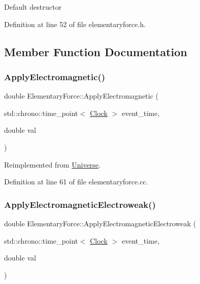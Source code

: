 Default destructor 

Definition at line 52 of file elementaryforce.\+h.



\subsection{Member Function Documentation}
\mbox{\label{class_elementary_force_a0045a3380e468c6cfdbefce829888c1f}} 
\subsubsection{\texorpdfstring{Apply\+Electromagnetic()}{ApplyElectromagnetic()}}
{\footnotesize\ttfamily double Elementary\+Force\+::\+Apply\+Electromagnetic (\begin{DoxyParamCaption}\item[{std\+::chrono\+::time\+\_\+point$<$ \mbox{\hyperlink{universe_8h_a0ef8d951d1ca5ab3cfaf7ab4c7a6fd80}{Clock}} $>$}]{event\+\_\+time,  }\item[{double}]{val }\end{DoxyParamCaption})\hspace{0.3cm}{\ttfamily [virtual]}}



Reimplemented from \mbox{\hyperlink{class_universe_a1f787da78fa196ba635db21a9e91dabb}{Universe}}.



Definition at line 61 of file elementaryforce.\+cc.

\mbox{\label{class_elementary_force_a3764a27b11760b6ead2c8a23ff25d77a}} 
\subsubsection{\texorpdfstring{Apply\+Electromagnetic\+Electroweak()}{ApplyElectromagneticElectroweak()}}
{\footnotesize\ttfamily double Elementary\+Force\+::\+Apply\+Electromagnetic\+Electroweak (\begin{DoxyParamCaption}\item[{std\+::chrono\+::time\+\_\+point$<$ \mbox{\hyperlink{universe_8h_a0ef8d951d1ca5ab3cfaf7ab4c7a6fd80}{Clock}} $>$}]{event\+\_\+time,  }\item[{double}]{val }\end{DoxyParamCaption})\hspace{0.3cm}{\ttfamily [virtual]}}



